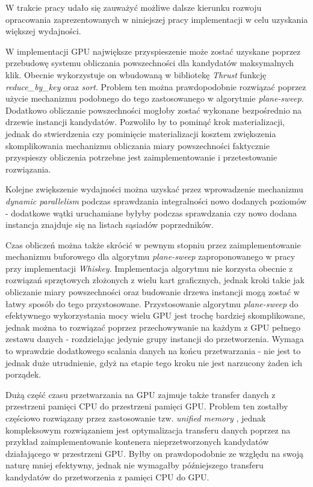 \documentclass[12pt]{article}
\begin{document}
W trakcie pracy udało się zauważyć możliwe dalsze kierunku rozwoju opracowania zaprezentowanych w niniejszej pracy implementacji w celu uzyskania większej wydajności.

W implementacji GPU największe przyspieszenie może zostać uzyskane poprzez przebudowę systemu obliczania powszechności dla kandydatów maksymalnych klik. Obecnie wykorzystuje on wbudowaną w bibliotekę \textit{Thrust} funkcję \textit{reduce\_by\_key} oraz \textit{sort}. Problem ten można prawdopodobnie rozwiązać poprzez użycie mechanizmu podobnego do tego zastosowanego w algorytmie \textit{plane-sweep}. Dodatkowo obliczanie powszechności mogłoby zostać wykonane bezpośrednio na drzewie instancji kandydatów. Pozwoliło by to pominąć krok materializacji, jednak do stwierdzenia czy pominięcie materializacji kosztem zwiększenia skomplikowania mechanizmu obliczania miary powszechności faktycznie przyspieszy obliczenia potrzebne jest zaimplementowanie i przetestowanie rozwiązania. 

Kolejne zwiększenie wydajności można uzyskać przez wprowadzenie mechanizmu \textit{dynamic parallelism} \cite{cuda_dp} podczas sprawdzania integralności nowo dodanych poziomów - dodatkowe wątki uruchamiane byłyby podczas sprawdzania czy nowo dodana instancja znajduje się na listach sąsiadów poprzedników.

Czas obliczeń można także skrócić w pewnym stopniu przez zaimplementowanie mechanizmu buforowego dla algorytmu \textit{plane-sweep} zaproponowanego w pracy \cite{plane2} przy implementacji \textit{Whiskey}. Implementacja algorytmu nie korzysta obecnie z rozwiązań sprzętowych złożonych z wielu kart graficznych, jednak kroki takie jak obliczanie miary powszechności oraz budowanie drzewa instancji mogą zostać w łatwy sposób do tego przystosowane. Przystosowanie algorytmu \textit{plane-sweep} do efektywnego wykorzystania mocy wielu GPU jest trochę bardziej skomplikowane, jednak można to rozwiązać poprzez przechowywanie na każdym z GPU pełnego zestawu danych - rozdzielając jedynie grupy instancji do przetworzenia. Wymaga to wprawdzie dodatkowego scalania danych na końcu przetwarzania - nie jest to jednak duże utrudnienie, gdyż na etapie tego kroku nie jest narzucony żaden ich porządek.

Dużą część czasu przetwarzania na GPU zajmuje także transfer danych z przestrzeni pamięci CPU do przestrzeni pamięci GPU. Problem ten zostałby częściowo rozwiązany przez zastosowanie tzw. \textit{unified memory} \cite{cuda_um}, jednak kompleksowym rozwiązaniem jest optymalizacja transferu danych poprzez na przykład zaimplementowanie kontenera nieprzetworzonych kandydatów działającego w przestrzeni GPU. Byłby on prawdopodobnie ze względu na swoją naturę mniej efektywny, jednak nie wymagałby późniejszego transferu kandydatów do przetworzenia z pamięci CPU do GPU.
\end{document}
